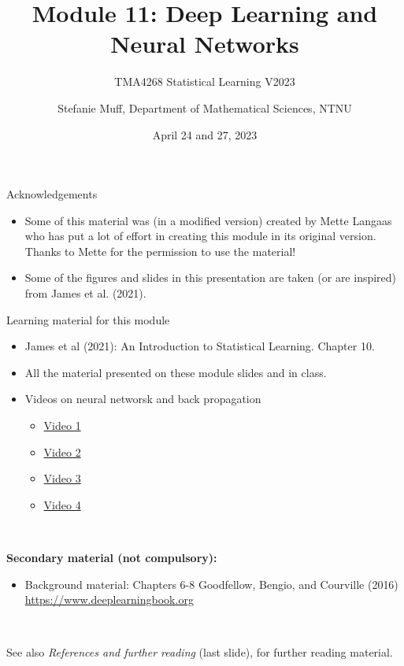 \documentclass[
  10pt,
  ignorenonframetext,
]{beamer}
\title{Module 11: Deep Learning and Neural Networks}
\subtitle{TMA4268 Statistical Learning V2023}
\author{Stefanie Muff, Department of Mathematical Sciences, NTNU}
\date{April 24 and 27, 2023}
\providecommand{\tightlist}{%
  \setlength{\itemsep}{0pt}\setlength{\parskip}{0pt}}
\begin{document}
\frame{\titlepage}

\begin{frame}{Acknowledgements}
\protect\hypertarget{acknowledgements}{}
\(~\)

\begin{itemize}
\item
  Some of this material was (in a modified version) created by Mette
  Langaas who has put a lot of effort in creating this module in its
  original version. Thanks to Mette for the permission to use the
  material!
\item
  Some of the figures and slides in this presentation are taken (or are
  inspired) from James et al. (2021).
\end{itemize}
\end{frame}

\begin{frame}
\begin{block}{Learning material for this module}
\protect\hypertarget{learning-material-for-this-module}{}
\vspace{2mm}

\begin{itemize}
\item
  James et al (2021): An Introduction to Statistical Learning. Chapter
  10.
\item
  All the material presented on these module slides and in class.
\item
  Videos on neural networsk and back propagation

  \begin{itemize}
  \tightlist
  \item
    \href{https://www.youtube.com/watch?v=aircAruvnKk}{Video 1}
  \item
    \href{https://www.youtube.com/watch?v=IHZwWFHWa-w}{Video 2}
  \item
    \href{https://www.youtube.com/watch?v=Ilg3gGewQ5U}{Video 3}
  \item
    \href{https://www.youtube.com/watch?v=tIeHLnjs5U8}{Video 4}
  \end{itemize}
\end{itemize}

\(~\)

\textbf{Secondary material (not compulsory):}

\vspace{2mm}

\begin{itemize}
\tightlist
\item
  Background material: Chapters 6-8 Goodfellow, Bengio, and Courville
  (2016) \url{https://www.deeplearningbook.org}
\end{itemize}

\(~\)

See also \emph{References and further reading} (last slide), for further
reading material.
\end{block}
\end{frame}
\end{document}
